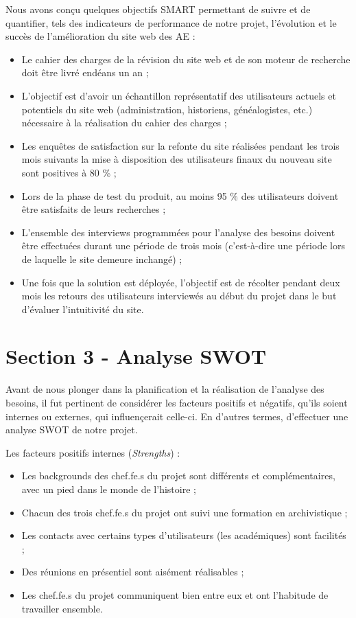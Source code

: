\documentclass[a4paper,12pt]{article}
\begin{document}
Nous avons conçu quelques objectifs SMART permettant de suivre et de quantifier, tels des indicateurs de performance de notre projet, l'évolution et le succès de l'amélioration du site web des AE :

\begin{itemize}
	\item Le cahier des charges de la révision du site web et de son moteur de recherche doit être livré endéans un an ;
	\item L’objectif est d’avoir un échantillon représentatif des utilisateurs actuels et potentiels du site web (administration, historiens, généalogistes, etc.) nécessaire à la réalisation du cahier des charges ;
	\item Les enquêtes de satisfaction sur la refonte du site réalisées pendant les trois mois suivants la mise à disposition des utilisateurs finaux du nouveau site sont positives à 80 \% ;
	\item Lors de la phase de test du produit, au moins 95 \% des utilisateurs doivent être satisfaits de leurs recherches ;
	\item L’ensemble des interviews programmées pour l’analyse des besoins doivent être effectuées durant une période de trois mois (c’est-à-dire une période lors de laquelle le site demeure inchangé) ;
	\item Une fois que la solution est déployée, l’objectif est de récolter pendant deux mois les retours des utilisateurs interviewés au début du projet dans le but d’évaluer l'intuitivité du site.
	
\end{itemize}

\section{Section 3 - Analyse SWOT}

Avant de nous plonger dans la planification et la réalisation de l'analyse des besoins, il fut pertinent de considérer les facteurs positifs et négatifs, qu'ils soient internes ou externes, qui influençerait celle-ci. En d'autres termes, d'effectuer une analyse SWOT de notre projet.

Les facteurs positifs internes (\textit{Strengths}) : 
\begin{itemize}
	\item Les backgrounds des chef.fe.s du projet sont différents et complémentaires, avec un pied dans le monde de l'histoire ;
	\item Chacun des trois chef.fe.s du projet ont suivi une formation en archivistique ;
	\item Les contacts avec certains types d'utilisateurs (les académiques) sont facilités ;
	\item Des réunions en présentiel sont aisément réalisables ;
	\item Les chef.fe.s du projet communiquent bien entre eux et ont l'habitude de travailler ensemble.
\end{itemize}
\end{document}

